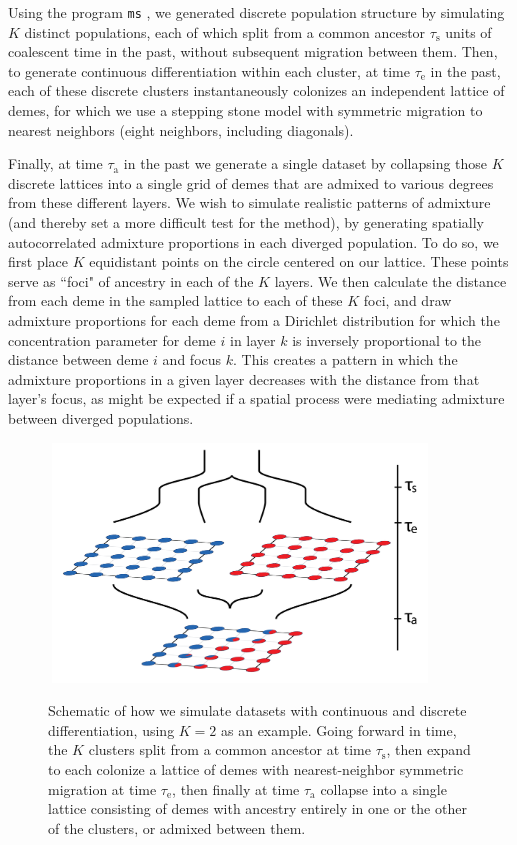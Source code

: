 \documentclass[12pt]{article}
\begin{document}
Using the program \texttt{ms} \citep{Hudson2002}, 
we generated discrete population structure by simulating $K$ distinct populations,
each of which split from a common ancestor $\tau_{\text{s}}$ units of coalescent time in the past,
without subsequent migration between them.
Then, to generate continuous differentiation within each cluster,
at time $\tau_{\text{e}}$ in the past,
each of these discrete clusters instantaneously colonizes an
independent lattice of demes,
for which we use a stepping stone model with symmetric migration 
to nearest neighbors (eight neighbors, including diagonals).

Finally, at time $\tau_{\text{a}}$ in the past 
we generate a single dataset 
by collapsing those $K$ discrete lattices into a single grid of demes 
that are admixed to various degrees from these different layers. 
We wish to simulate realistic patterns of admixture 
(and thereby set a more difficult test for the method), 
by generating spatially autocorrelated admixture proportions 
in each diverged population.
To do so, we first place $K$ equidistant points on the circle centered on our lattice.  
These points serve as ``foci" of ancestry in each of the $K$ layers.  
We then calculate the distance from each deme in the sampled lattice to each of these $K$ foci, 
and draw admixture proportions for each deme 
from a Dirichlet distribution for which the concentration parameter 
for deme $i$ in layer $k$ is inversely proportional to the distance between deme $i$ and focus $k$. 
This creates a pattern in which the admixture proportions in a given layer decreases 
with the distance from that layer's focus, 
as might be expected if a spatial process were mediating admixture between diverged populations.

\begin{figure}
	\centering
		{\includegraphics[width=4in,height=2.5in]{figs/sims/sim_setup.png}}
		\caption{Schematic of how we simulate datasets with continuous and discrete differentiation, using $K=2$ as an example.  
			    Going forward in time, the $K$ clusters split from a common ancestor at time $\tau_{\text{s}}$,
			    then expand to each  colonize a lattice of demes with nearest-neighbor symmetric migration at time $\tau_{\text{e}}$,
			    then finally at time $\tau_{\text{a}}$ collapse into a single lattice consisting of demes 
			    with ancestry entirely in one or the other of the clusters,
			    or admixed between them.
			    }\label{sim_setup}
\end{figure}
\end{document}
